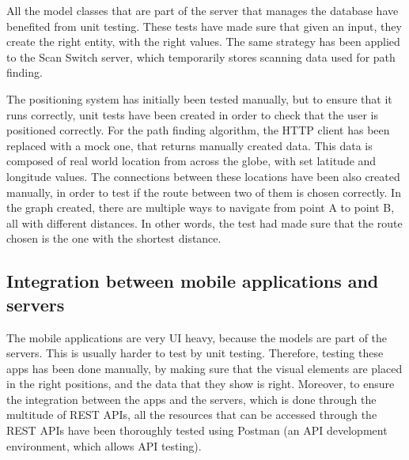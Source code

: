 All the model classes that are part of the server that manages the database have benefited from unit testing. These tests have made sure that given an input, they create the right entity, with the right values. The same strategy has been applied to the Scan Switch server, which temporarily stores scanning data used for path finding. 

The positioning system has initially been tested manually, but to ensure that it runs correctly, unit tests have been created in order to check that the user is positioned correctly. For the path finding algorithm, the HTTP client has been replaced with a mock one, that returns manually created data. This data is composed of real world location from across the globe, with set latitude and longitude values. The connections between these locations have been also created manually, in order to test if the route between two of them is chosen correctly. In the graph created, there are multiple ways to navigate from point A to point B, all with different distances. In other words, the test had made sure that the route chosen is the one with the shortest distance.

\subsection{Integration between mobile applications and servers}
The mobile applications are very UI heavy, because the models are part of the servers. This is usually harder to test by unit testing. Therefore, testing these apps has been done manually, by making sure that the visual elements are placed in the right positions, and the data that they show is right. Moreover, to ensure the integration between the apps and the servers, which is done through the multitude of REST APIs, all the resources that can be accessed through the REST APIs have been thoroughly tested using Postman (an API development environment, which allows API testing). 
